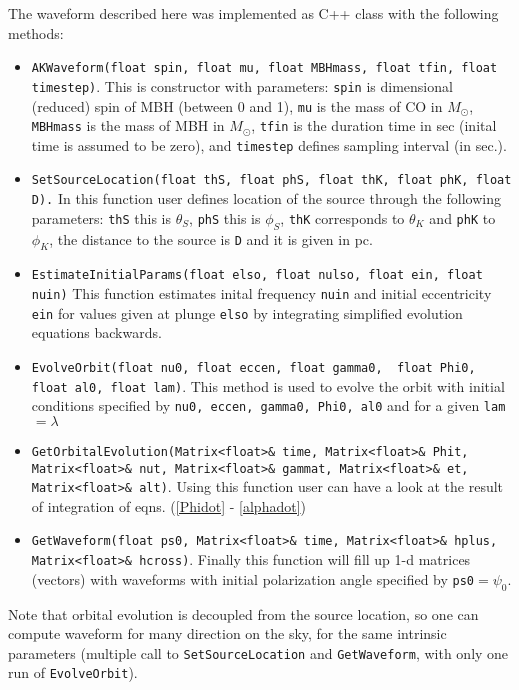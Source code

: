 \documentclass[11pt]{report}
\begin{document}
The waveform described here was implemented as C++ class with 
the following methods:
\begin{itemize}
\item {\tt AKWaveform(float spin, float mu, float MBHmass, float tfin, float timestep)}. This is constructor with parameters: {\tt spin}  is dimensional (reduced) spin of MBH (between 0 and 1), {\tt mu} is the mass of CO in $M_{\odot}$, {\tt MBHmass} is the mass of MBH
in $M_{\odot}$, {\tt tfin} is the duration time in sec (inital time is assumed to be zero), and {\tt timestep} defines sampling interval 
(in sec.). 
\item {\tt SetSourceLocation(float thS, float phS,  float thK, float phK, float D).} In this function user defines location of the source through
the following parameters: {\tt thS} this is $\theta_S$, {\tt phS}
this is $\phi_S$, {\tt thK} corresponds to $\theta_K$ and 
{\tt phK} to $\phi_K$, the distance to the source is {\tt D} and
it is given in pc.

\item {\tt EstimateInitialParams(float elso, float nulso, float ein, 
float nuin)}
This function estimates inital frequency {\tt nuin} and initial
eccentricity {\tt ein} for values given at plunge {\tt elso}
by integrating simplified evolution equations backwards.

\item {\tt EvolveOrbit(float nu0, float eccen, float gamma0, \
		    float Phi0, float al0, float lam)}. This method is used 
to evolve the orbit with initial conditions specified by 
{\tt nu0, eccen, gamma0, Phi0, al0} and for a given {\tt lam} 
$= \lambda$ 

\item {\tt GetOrbitalEvolution(Matrix<float>\& time, Matrix<float>\& Phit, Matrix<float>\& nut,  Matrix<float>\& gammat, Matrix<float>\& et, Matrix<float>\& alt)}. Using this function user can have a look at the result of integration of eqns. (\ref{Phidot} - \ref{alphadot})

\item {\tt GetWaveform(float ps0, Matrix<float>\& time, Matrix<float>\& hplus,  Matrix<float>\& hcross)}. Finally this function will 
fill up 1-d matrices (vectors) with waveforms with initial 
polarization angle specified by {\tt ps0}$= \psi_0$.
\end{itemize}
Note that orbital evolution is decoupled from the source location,
so one can compute waveform for many direction on the sky, 
for the same intrinsic parameters (multiple call to {\tt SetSourceLocation} and {\tt GetWaveform}, with only one run of
{\tt EvolveOrbit}).
\end{document}
